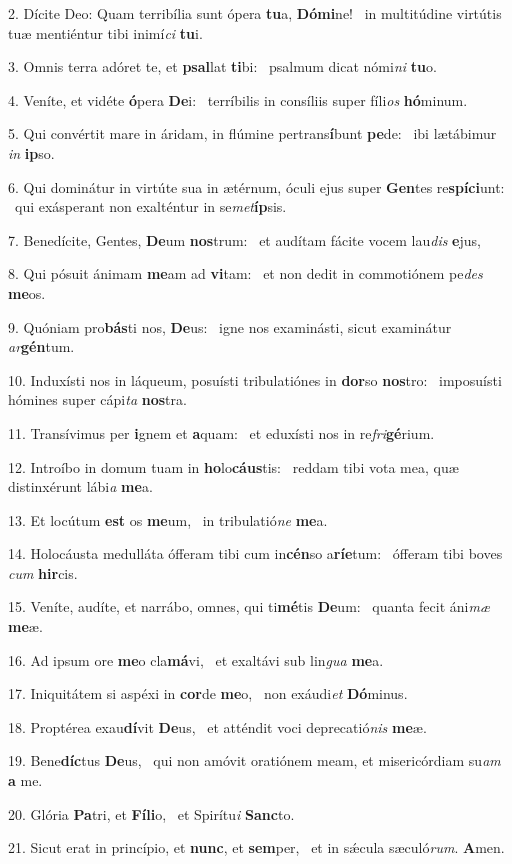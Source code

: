 2. Dícite Deo: Quam terribília sunt ópera \textbf{tu}a, \textbf{Dó}\textbf{mi}ne! \ast\  in multitúdine virtútis tuæ mentiéntur tibi inimí\textit{ci} \textbf{tu}i.\

3. Omnis terra adóret te, et \textbf{psal}lat \textbf{ti}bi: \ast\  psalmum dicat nómi\textit{ni} \textbf{tu}o.\

4. Veníte, et vidéte \textbf{ó}pera \textbf{De}i: \ast\  terríbilis in consíliis super fíli\textit{os} \textbf{hó}minum.\

5. Qui convértit mare in áridam, in flúmine pertrans\textbf{í}bunt \textbf{pe}de: \ast\  ibi lætábimur \textit{in} \textbf{ip}so.\

6. Qui dominátur in virtúte sua in ætérnum, óculi ejus super \textbf{Gen}tes re\textbf{spí}\textbf{ci}unt: \ast\  qui exásperant non exalténtur in se\textit{met}\textbf{íp}sis.\

7. Benedícite, Gentes, \textbf{De}um \textbf{nos}trum: \ast\  et audítam fácite vocem lau\textit{dis} \textbf{e}jus,\

8. Qui pósuit ánimam \textbf{me}am ad \textbf{vi}tam: \ast\  et non dedit in commotiónem pe\textit{des} \textbf{me}os.\

9. Quóniam pro\textbf{bás}ti nos, \textbf{De}us: \ast\  igne nos examinásti, sicut examinátur \textit{ar}\textbf{gén}tum.\

10. Induxísti nos in láqueum, posuísti tribulatiónes in \textbf{dor}so \textbf{nos}tro: \ast\  imposuísti hómines super cápi\textit{ta} \textbf{nos}tra.\

11. Transívimus per \textbf{i}gnem et \textbf{a}quam: \ast\  et eduxísti nos in re\textit{fri}\textbf{gé}rium.\

12. Introíbo in domum tuam in \textbf{ho}lo\textbf{cáus}tis: \ast\  reddam tibi vota mea, quæ distinxérunt lábi\textit{a} \textbf{me}a.\

13. Et locútum \textbf{est} os \textbf{me}um, \ast\  in tribulatió\textit{ne} \textbf{me}a.\

14. Holocáusta medulláta ófferam tibi cum in\textbf{cén}so a\textbf{rí}\textbf{e}tum: \ast\  ófferam tibi boves \textit{cum} \textbf{hir}cis.\

15. Veníte, audíte, et narrábo, omnes, qui ti\textbf{mé}tis \textbf{De}um: \ast\  quanta fecit áni\textit{mæ} \textbf{me}æ.\

16. Ad ipsum ore \textbf{me}o cla\textbf{má}vi, \ast\  et exaltávi sub lin\textit{gua} \textbf{me}a.\

17. Iniquitátem si aspéxi in \textbf{cor}de \textbf{me}o, \ast\  non exáudi\textit{et} \textbf{Dó}minus.\

18. Proptérea exau\textbf{dí}vit \textbf{De}us, \ast\  et atténdit voci deprecatió\textit{nis} \textbf{me}æ.\

19. Bene\textbf{díc}tus \textbf{De}us, \ast\  qui non amóvit oratiónem meam, et misericórdiam su\textit{am} \textbf{a} me.\

20. Glória \textbf{Pa}tri, et \textbf{Fí}\textbf{li}o, \ast\  et Spirítu\textit{i} \textbf{Sanc}to.\

21. Sicut erat in princípio, et \textbf{nunc}, et \textbf{sem}per, \ast\  et in sǽcula sæculó\textit{rum}. \textbf{A}men.\

